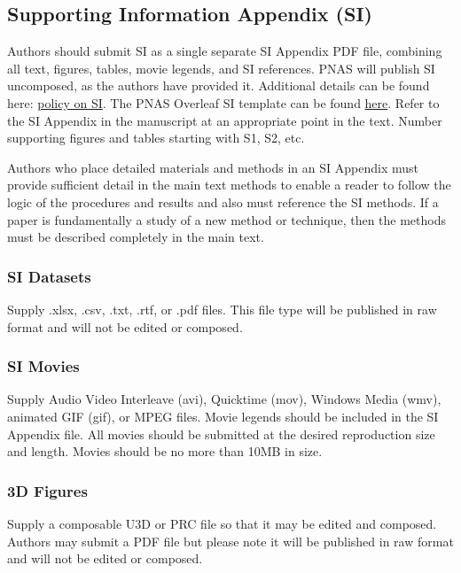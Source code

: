 \documentclass[9pt,twocolumn,twoside,lineno]{pnas-new}
\begin{document}
\subsection*{Supporting Information Appendix (SI)}

Authors should submit SI as a single separate SI Appendix PDF file, combining all text, figures, tables, movie legends, and SI references. PNAS will publish SI uncomposed, as the authors have provided it. Additional details can be found here: \href{https://www.pnas.org/page/authors/format#Supporting_Information}{policy on SI}. The PNAS Overleaf SI template can be found \href{https://www.overleaf.com/latex/templates/pnas-template-for-supplementary-information/wqfsfqwyjtsd}{here}. Refer to the SI Appendix in the manuscript at an appropriate point in the text. Number supporting figures and tables starting with S1, S2, etc.

Authors who place detailed materials and methods in an SI Appendix must provide sufficient detail in the main text methods to enable a reader to follow the logic of the procedures and results and also must reference the SI methods. If a paper is fundamentally a study of a new method or technique, then the methods must be described completely in the main text.

\subsubsection*{SI Datasets} 

Supply .xlsx, .csv, .txt, .rtf, or .pdf files. This file type will be published in raw format and will not be edited or composed.


\subsubsection*{SI Movies}

Supply Audio Video Interleave (avi), Quicktime (mov), Windows Media (wmv), animated GIF (gif), or MPEG files. Movie legends should be included in the SI Appendix file. All movies should be submitted at the desired reproduction size and length. Movies should be no more than 10MB in size.


\subsubsection*{3D Figures}

Supply a composable U3D or PRC file so that it may be edited and composed. Authors may submit a PDF file but please note it will be published in raw format and will not be edited or composed.
\end{document}
